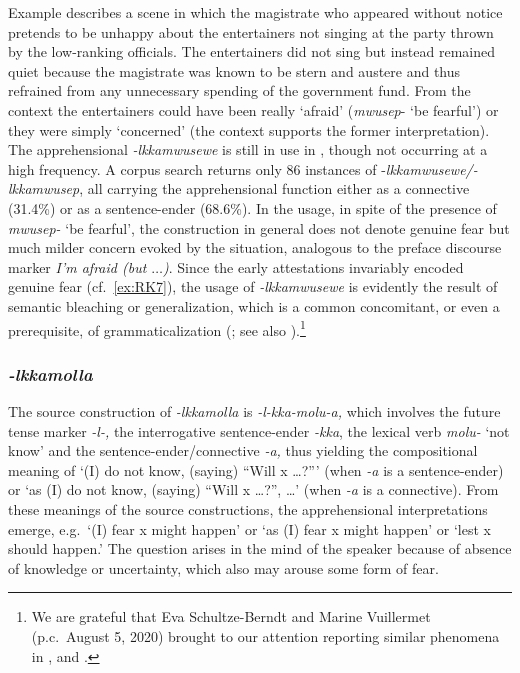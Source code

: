 \documentclass[output=paper,colorlinks,citecolor=brown]{langscibook}
\begin{document}
\noindent Example  describes a scene in which the magistrate who appeared without notice pretends to be unhappy about the entertainers not singing at the party thrown by the low-ranking officials. The entertainers did not sing but instead remained quiet because the magistrate was known to be stern and austere and thus refrained from any unnecessary spending of the government fund. From the context the entertainers could have been really `afraid' (\textit{mwusep}- `be fearful') or they were simply `concerned' (the context supports the former interpretation). The apprehensional \textit{-lkkamwusewe} is still in use in , though not occurring at a high frequency. A corpus search returns only 86 instances of  \nobreakdash-\textit{lkkamwusewe/-lkkamwusep}, all carrying the apprehensional function either as a connective (31.4\%) or as a sentence-ender (68.6\%). In the  usage, in spite of the presence of \textit{mwusep-} `be fearful', the construction in general does not denote genuine fear but much milder concern evoked by the situation, analogous to the  preface discourse marker \textit{I'm afraid \textup{(}but $\ldots$\textup{)}}. Since the early attestations invariably encoded genuine fear (cf.\ \ref{ex:RK7}), the  usage of \textit{-lkkamwusewe} is evidently the result of semantic bleaching or generalization, which is a common concomitant, or even a prerequisite, of grammaticalization (\citealt{BybeePagliuca1985,bybeeetal1994}; see also ).\footnote{We are grateful that Eva Schultze-Berndt and Marine Vuillermet (p.c.\  August 5, 2020) brought to our attention \citet{Jing-SchmidtKapatsinski2012} reporting similar phenomena in ,  and .}  



\subsubsection{\textit{-lkkamolla}} 
The source construction of \textit{-lkkamolla} is \textit{-l-kka-molu-a,} which involves the future tense marker \textit{-l-,} the interrogative sentence-ender \textit{-kka}, the lexical verb \textit{molu-} `not know' and the sentence-ender/connective \textit{-a,} thus yielding the compositional meaning of `(I) do not know, (saying) ``Will x …?''' (when \textit{-a} is a sentence-ender) or `as (I) do not know, (saying) ``Will x …?'',  …' (when \textit{-a} is a connective). From these meanings of the source constructions, the apprehensional interpretations emerge, e.g.\  `(I) fear x might happen' or `as (I) fear x might happen' or `lest x should happen.' The question arises in the mind of the speaker because of absence of knowledge or uncertainty, which also may arouse some form of fear.
\end{document}
